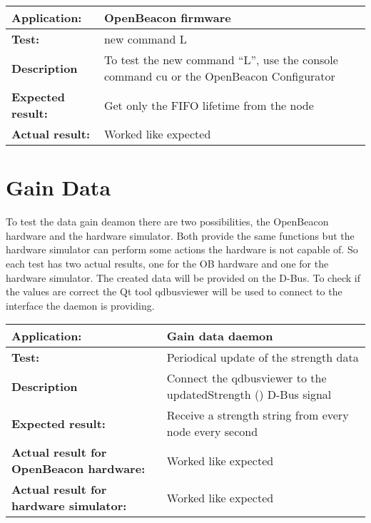    \begin{tabular}{|p{3.5cm}|p{10.5cm}|}
    \hline
     \textbf{Application:}	& OpenBeacon firmware\\
    \hline
     \textbf{Test:}		& new command L\\
    \hline
     \textbf{Description}	& To test the new command ``L'', use the console command cu or the OpenBeacon Configurator\\
    \hline
     \textbf{Expected result:}	& Get only the FIFO lifetime from the node\\
    \hline
     \textbf{Actual result:}	& Worked like expected\\
    \hline
   \end{tabular}

 \section{Gain Data}
  To test the data gain deamon there are two possibilities, the OpenBeacon hardware and the hardware simulator. Both provide the same functions but the hardware simulator can perform some actions the hardware is not capable of. So each test has two actual results, one for the OB hardware and one for the hardware simulator. The created data will be provided on the D-Bus. To check if the values are correct the Qt tool qdbusviewer will be used to connect to the interface the daemon is providing.\\
   \begin{tabular}{|p{3.5cm}|p{10.5cm}|}
    \hline
     \textbf{Application:}				& Gain data daemon\\
    \hline
     \textbf{Test:}					& Periodical update of the strength data\\
    \hline
     \textbf{Description}				& Connect the qdbusviewer to the updatedStrength () D-Bus signal\\
    \hline
     \textbf{Expected result:}				& Receive a strength string from every node every second\\
    \hline
     \textbf{Actual result for OpenBeacon hardware:}	& Worked like expected\\
    \hline
     \textbf{Actual result for hardware simulator:}	& Worked like expected\\
    \hline
   \end{tabular}\\
